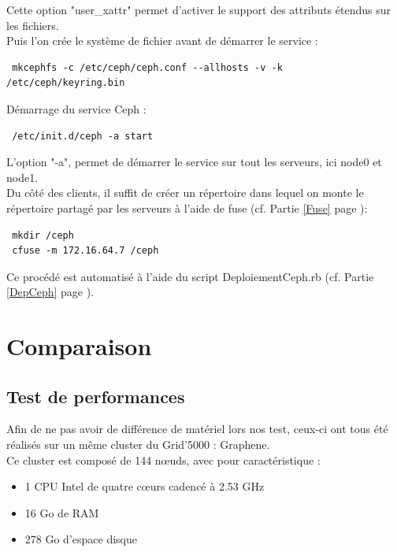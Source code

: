 \documentclass[12pt]{report}
\begin{document}
                        Cette option "user\_xattr" permet d'activer le support des attributs étendus sur les fichiers.\\
                        Puis l'on crée le système de fichier avant de démarrer le service :
                        \begin{lstlisting}
 mkcephfs -c /etc/ceph/ceph.conf --allhosts -v -k /etc/ceph/keyring.bin
                        \end{lstlisting}
                        Démarrage du service Ceph :
                        \begin{lstlisting}
 /etc/init.d/ceph -a start
                        \end{lstlisting}
                        L'option "-a", permet de démarrer le service sur tout les serveurs, ici node0 et node1.\\
                        
                        Du côté des clients, il suffit de créer un répertoire dans lequel on monte le répertoire partagé par les serveurs à l'aide de fuse (cf. Partie \ref{Fuse} page \pageref{Fuse}):
                        \begin{lstlisting}
 mkdir /ceph
 cfuse -m 172.16.64.7 /ceph
                        \end{lstlisting}
                        Ce procédé est automatisé à l'aide du script DeploiementCeph.rb (cf. Partie \ref{DepCeph} page \pageref{DepCeph}).
	\chapter{Comparaison}
		\section{Test de performances}
			Afin de ne pas avoir de différence de matériel lors nos test, ceux-ci ont tous été réalisés sur un même cluster du Grid'5000 : Graphene.\\

			Ce cluster est composé de 144 nœuds, avec pour caractéristique :
			\begin{itemize}
				\item 1 CPU Intel de quatre cœurs cadencé à 2.53 GHz
				\item 16 Go de RAM
				\item 278 Go d'espace disque\\
			\end{itemize}
\end{document}
